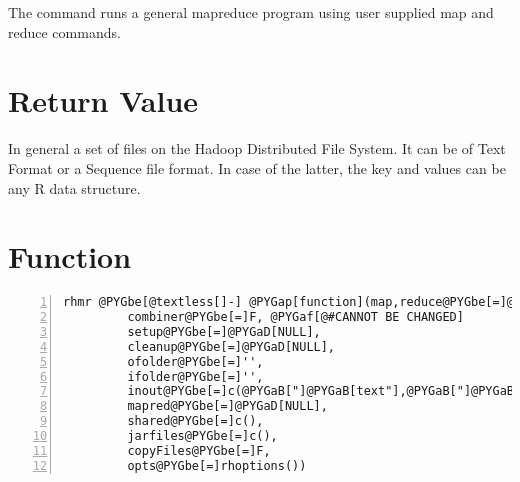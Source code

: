 \documentclass[letterpaper,10pt,english]{manual}
\begin{document}
The  command runs a general mapreduce program using user supplied map
and reduce commands.


\section{Return Value}

In general a set of files on the Hadoop Distributed File System. It can be of
Text Format or a Sequence file format. In case of the latter, the key and values
can be any R data structure.


\section{Function}

\begin{Verbatim}[commandchars=@\[\],numbers=left,firstnumber=1,stepnumber=1]
rhmr @PYGbe[@textless[]-] @PYGap[function](map,reduce@PYGbe[=]@PYGaD[NULL],
         combiner@PYGbe[=]F, @PYGaf[@#CANNOT BE CHANGED]
         setup@PYGbe[=]@PYGaD[NULL],
         cleanup@PYGbe[=]@PYGaD[NULL],
         ofolder@PYGbe[=]'',
         ifolder@PYGbe[=]'',
         inout@PYGbe[=]c(@PYGaB["]@PYGaB[text"],@PYGaB["]@PYGaB[text"]),
         mapred@PYGbe[=]@PYGaD[NULL],
         shared@PYGbe[=]c(),
         jarfiles@PYGbe[=]c(),
         copyFiles@PYGbe[=]F,
         opts@PYGbe[=]rhoptions())
\end{Verbatim}
\end{document}

